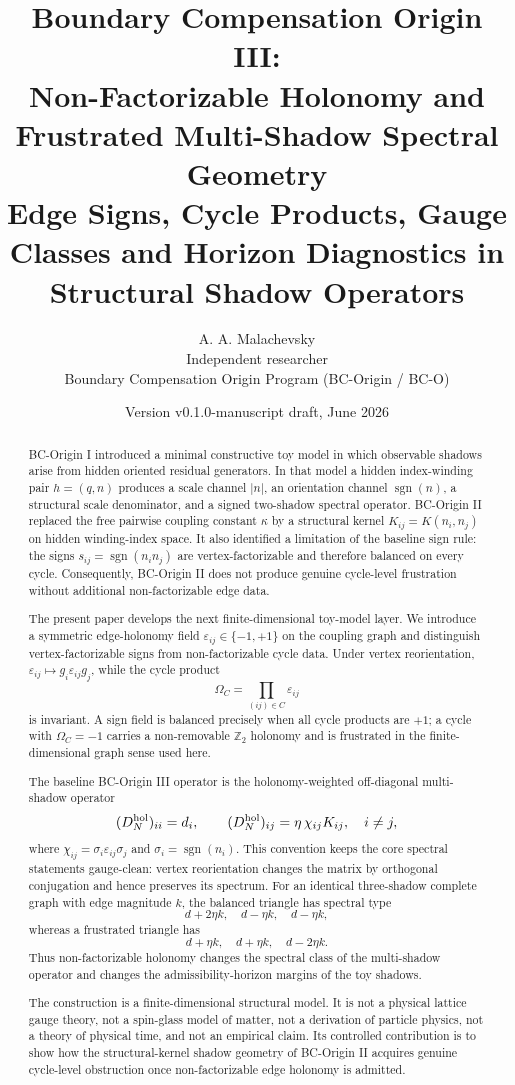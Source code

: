 \documentclass[11pt]{article}
\title{Boundary Compensation Origin III:\\
Non-Factorizable Holonomy and Frustrated Multi-Shadow Spectral Geometry\\
\large Edge Signs, Cycle Products, Gauge Classes and Horizon Diagnostics in Structural Shadow Operators}
\author{A. A. Malachevsky\\
Independent researcher\\
Boundary Compensation Origin Program (BC-Origin / BC-O)}
\date{Version v0.1.0-manuscript draft, June 2026}
\newcommand{\sgn}{\operatorname{sgn}}
\begin{document}
\maketitle

\begin{abstract}
BC-Origin I introduced a minimal constructive toy model in which observable shadows arise from hidden oriented residual generators. In that model a hidden index-winding pair $h=(q,n)$ produces a scale channel $|n|$, an orientation channel $\sgn(n)$, a structural scale denominator, and a signed two-shadow spectral operator. BC-Origin II replaced the free pairwise coupling constant $\kappa$ by a structural kernel $K_{ij}=K(n_i,n_j)$ on hidden winding-index space. It also identified a limitation of the baseline sign rule: the signs $s_{ij}=\sgn(n_i n_j)$ are vertex-factorizable and therefore balanced on every cycle. Consequently, BC-Origin II does not produce genuine cycle-level frustration without additional non-factorizable edge data.

The present paper develops the next finite-dimensional toy-model layer. We introduce a symmetric edge-holonomy field $\varepsilon_{ij}\in\{-1,+1\}$ on the coupling graph and distinguish vertex-factorizable signs from non-factorizable cycle data. Under vertex reorientation, $\varepsilon_{ij}\mapsto g_i\varepsilon_{ij}g_j$, while the cycle product
\[
\Omega_C=\prod_{(ij)\in C}\varepsilon_{ij}
\]
is invariant. A sign field is balanced precisely when all cycle products are $+1$; a cycle with $\Omega_C=-1$ carries a non-removable $\mathbb Z_2$ holonomy and is frustrated in the finite-dimensional graph sense used here.

The baseline BC-Origin III operator is the holonomy-weighted off-diagonal multi-shadow operator
\[
(D^{\rm hol}_N)_{ii}=d_i,\qquad
(D^{\rm hol}_N)_{ij}=\eta\,\chi_{ij}K_{ij},\quad i\ne j,
\]
where $\chi_{ij}=\sigma_i\varepsilon_{ij}\sigma_j$ and $\sigma_i=\sgn(n_i)$. This convention keeps the core spectral statements gauge-clean: vertex reorientation changes the matrix by orthogonal conjugation and hence preserves its spectrum. For an identical three-shadow complete graph with edge magnitude $k$, the balanced triangle has spectral type
\[
d+2\eta k,\quad d-\eta k,\quad d-\eta k,
\]
whereas a frustrated triangle has
\[
d+\eta k,
\quad d+\eta k,
\quad d-2\eta k.
\]
Thus non-factorizable holonomy changes the spectral class of the multi-shadow operator and changes the admissibility-horizon margins of the toy shadows.

The construction is a finite-dimensional structural model. It is not a physical lattice gauge theory, not a spin-glass model of matter, not a derivation of particle physics, not a theory of physical time, and not an empirical claim. Its controlled contribution is to show how the structural-kernel shadow geometry of BC-Origin II acquires genuine cycle-level obstruction once non-factorizable edge holonomy is admitted.
\end{abstract}
\end{document}

